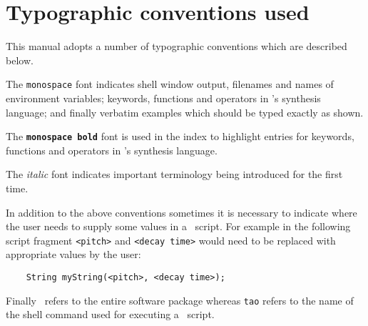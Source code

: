 \section{Typographic conventions used}
This manual adopts a number of typographic conventions
 which are described below.

The \texttt{monospace} font indicates shell window output,
filenames and names of environment variables; keywords, functions
and operators in \tao's synthesis language; and finally verbatim
examples which should be typed exactly as shown.

The \textbf{\texttt{monospace bold}} font is used in the index to highlight
entries for keywords, functions and operators in \tao's synthesis language.

The \emph{italic} font indicates important terminology being introduced for
the first time.

In addition to the above conventions sometimes it is necessary to indicate
where the user needs to supply some values in a \tao\ script. For example
in the following script fragment \verb|<pitch>| and \verb|<decay time>| would
need to be replaced with appropriate values by the user:

\begin{verbatim}
    String myString(<pitch>, <decay time>);
\end{verbatim}

Finally \tao\ refers to the entire software package whereas \verb|tao|
refers to the name of the shell command used for executing a \tao\ script.
















